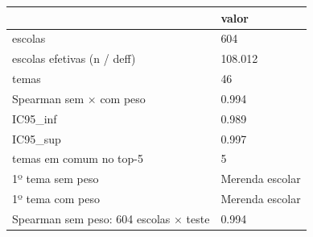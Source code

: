 \begin{tabular}{ll}
\toprule
 & valor \\
\midrule
escolas & 604 \\
escolas efetivas (n / deff) & 108.012 \\
temas & 46 \\
Spearman sem × com peso & 0.994 \\
IC95\_inf & 0.989 \\
IC95\_sup & 0.997 \\
temas em comum no top-5 & 5 \\
1º tema sem peso & Merenda escolar \\
1º tema com peso & Merenda escolar \\
Spearman sem peso: 604 escolas × teste & 0.994 \\
\bottomrule
\end{tabular}
